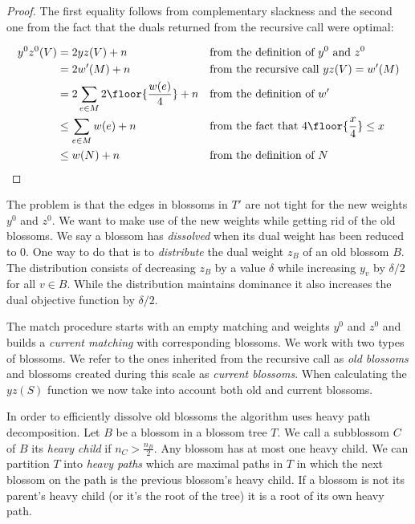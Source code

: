 \begin{proof}
    The first equality follows from complementary slackness and the second one from the fact that the duals returned from the recursive call were optimal:

    \begin{align*}
        y^0z^0(V) &= 2yz(V) + n && \text{from the definition of $y^0$ and $z^0$}\\
        &= 2w'(M) + n && \text{from the recursive call $yz(V) = w'(M)$} \\
        &= 2 \sum_{e \in M} 2 \floor{\frac{w(e)}{4}} + n && \text{from the definition of $w'$} \\
        &\leq \sum_{e \in M} w(e) + n && \text{from the fact that $4\floor{\frac{x}{4}} \leq x$} \\
        &\leq w(N) + n  && \text{from the definition of $N$} \\
    \end{align*}    
\end{proof}

The problem is that the edges in blossoms in $T'$ are not tight for the new weights $y^0$ and $z^0$. We want to make use of the new weights while getting rid of the old blossoms. We say a blossom has \textit{dissolved} when its dual weight has been reduced to $0$. One way to do that is to \textit{distribute} the dual weight $z_B$ of an old blossom $B$. The distribution consists of decreasing $z_B$ by a value $\delta$ while increasing $y_v$ by $\delta / 2$ for all $v \in B$. While the distribution maintains dominance it also increases the dual objective function by $\delta / 2$. 

The match procedure starts with an empty matching and weights $y^0$ and $z^0$ and builds a \textit{current matching} with corresponding blossoms. We work with two types of blossoms. We refer to the ones inherited from the recursive call as \textit{old blossoms} and blossoms created during this scale as \textit{current blossoms}. When calculating the $yz(S)$ function we now take into account both old and current blossoms.

In order to efficiently dissolve old blossoms the algorithm uses heavy path decomposition. Let $B$ be a blossom in a blossom tree $T$. We call a subblossom $C$ of $B$ its \textit{heavy child} if $n_C > \frac{n_B}{2}$. Any blossom has at most one heavy child. We can partition $T$ into \textit{heavy paths} which are maximal paths in $T$ in which the next blossom on the path is the previous blossom's heavy child. If a blossom is not its parent's heavy child (or it's the root of the tree) it is a root of its own heavy path.

